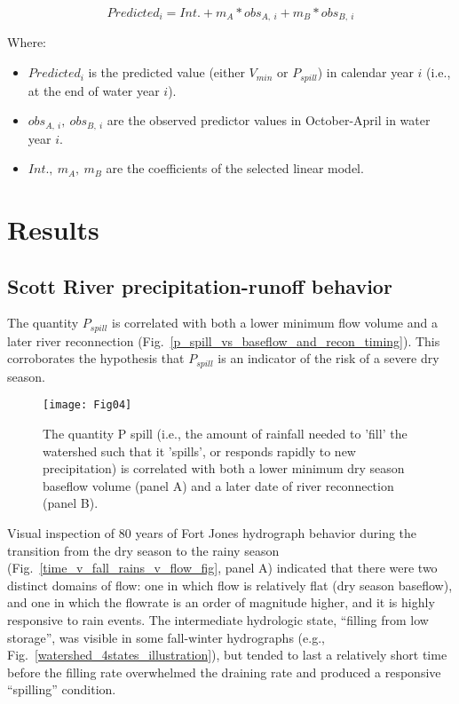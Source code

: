 \documentclass[hess, manuscript]{copernicus}
\providecommand{\tightlist}{%
  \setlength{\itemsep}{0pt}\setlength{\parskip}{0pt}}
\begin{document}
\begin{equation}
Predicted_{i} = Int. + m_A * obs_{A,~i}+m_B*obs_{B,~i}
\end{equation}

Where:

\begin{itemize}
\tightlist
\item
  $Predicted_i$ is the predicted value (either $V_{min}$ or
  $P_{spill}$) in calendar year $i$ (i.e., at the end of water year
  $i$).
\item
  $obs_{A,~i},~obs_{B,~i}$ are the observed predictor values in
  October-April in water year $i$.
\item
  $Int.,~m_A,~m_B$ are the coefficients of the selected linear model.
\end{itemize}

\section{Results}

\subsection{Scott River precipitation-runoff behavior}

The quantity $P_{spill}$ is correlated with both a lower minimum flow
volume and a later river reconnection
(Fig.~\ref{p_spill_vs_baseflow_and_recon_timing}). This corroborates
the hypothesis that $P_{spill}$ is an indicator of the risk of a
severe dry season.

\begin{figure}
\texttt{[image: Fig04]} \caption{\label{fig:p_spill_vs_baseflow_and_recon_timing} The quantity P spill (i.e., the amount of rainfall needed to 'fill' the watershed such that it 'spills', or responds rapidly to new precipitation) is correlated with both a lower minimum dry season baseflow volume (panel A) and a later date of river reconnection (panel B).}\label{fig:p_spill_vs_baseflow_and_recon_timing}
\end{figure}

Visual inspection of 80 years of Fort Jones hydrograph behavior during
the transition from the dry season to the rainy season
(Fig.~\ref{time_v_fall_rains_v_flow_fig}, panel A) indicated that
there were two distinct domains of flow: one in which flow is relatively
flat (dry season baseflow), and one in which the flowrate is an order of
magnitude higher, and it is highly responsive to rain events. The
intermediate hydrologic state, ``filling from low storage'', was visible
in some fall-winter hydrographs (e.g.,
Fig.~\ref{watershed_4states_illustration}), but tended to last a
relatively short time before the filling rate overwhelmed the draining
rate and produced a responsive ``spilling'' condition.
\end{document}
